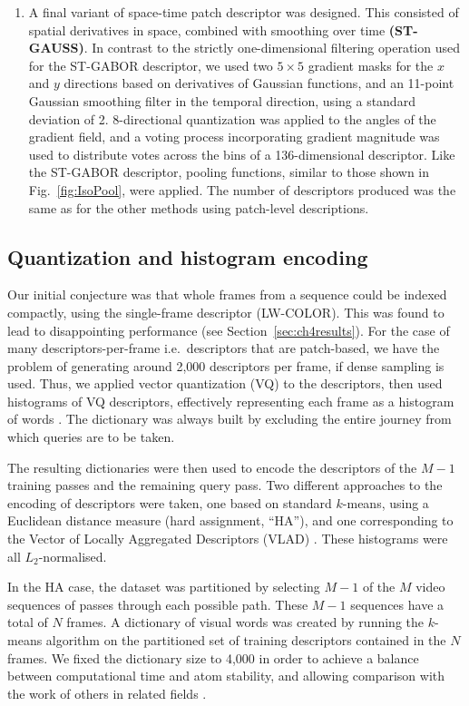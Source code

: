 \begin{enumerate}
\item A final variant of space-time patch descriptor was designed.  This consisted of spatial derivatives in space, combined with smoothing over time \textbf{(ST-GAUSS)}.  In contrast to the strictly one-dimensional filtering operation used for the ST-GABOR descriptor, we used two $5\times 5$ gradient masks for the $x$ and $y$ directions based on derivatives of Gaussian functions, and an 11-point Gaussian smoothing filter in the temporal direction, using a standard deviation of 2.  8-directional quantization was applied to the angles of the gradient field, and a voting process incorporating gradient magnitude was used to distribute votes across the bins of a 136-dimensional descriptor.  Like the ST-GABOR descriptor, pooling functions, similar to those shown in Fig.~\ref{fig:IsoPool}, were applied.  The number of descriptors produced was the same as for the other methods using patch-level descriptions.
\end{enumerate}


\subsection{Quantization and histogram encoding}

Our initial conjecture was that whole frames from a sequence could be indexed compactly, using the single-frame descriptor (LW-COLOR).  This was found to lead to disappointing performance (see Section~\ref{sec:ch4results}). For the case of many descriptors-per-frame i.e.\ descriptors that are patch-based, we have the problem of generating around 2,000 descriptors per frame, if dense sampling is used.  Thus, we applied vector quantization (VQ) to the descriptors, then used histograms of VQ descriptors, effectively representing each frame as a histogram of words \citep{Csurka2004}. The dictionary was always built by excluding the entire journey from which queries are to be taken.  

The resulting dictionaries were then used to encode the descriptors of the $M-1$ training passes and the remaining query pass. Two different approaches to the encoding of descriptors were taken, one based on standard $k$-means, using a Euclidean distance measure (hard assignment, ``HA''), and one corresponding to the Vector of Locally Aggregated Descriptors (VLAD) \citep{jegou2010aggregating}. These histograms were all $L_2$-normalised.  

In the HA case, the dataset was partitioned by selecting $M-1$ of the $M$ video sequences of passes through each possible path. These $M-1$ sequences have a total of $N$ frames. A dictionary of visual words was created by running the $k$-means algorithm on the partitioned set of training descriptors contained in the $N$ frames.   We fixed the dictionary size to 4,000 in order to achieve a balance between computational time and atom stability, and allowing comparison with the work of others in related fields \cite{Chatfield2011}.

